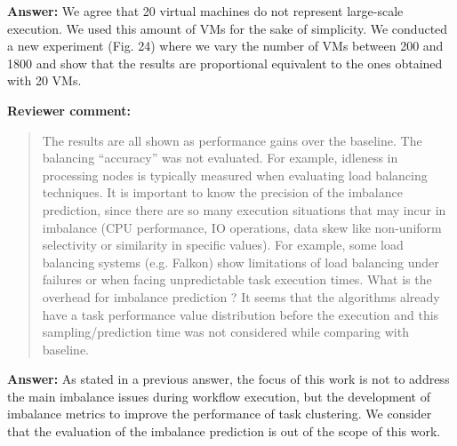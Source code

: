 \documentclass{letter}
\newenvironment{review}%
{\textbf{Reviewer comment:}\begin{quote}}%
{\end{quote}}%
\newcommand{\answer}[1]{%
      \textbf{Answer:} #1}
\begin{document}
\begin{letter}{}
\answer{We agree that 20 virtual machines do not represent large-scale execution. We used this amount of VMs for the sake of simplicity. We conducted a new experiment (Fig. 24) where we vary the number of VMs between 200 and 1800 and show that the results are proportional equivalent to the ones obtained with 20 VMs.}


\begin{review}
The results are all shown as performance gains over the baseline. The balancing ``accuracy'' was not evaluated. For example, idleness in processing nodes is typically measured when evaluating load balancing techniques. It is important to know the precision of the imbalance prediction, since there are so many execution situations that may incur in imbalance (CPU performance, IO operations, data skew like non-uniform selectivity or similarity in specific values). For example, some load balancing systems (e.g. Falkon) show limitations of load balancing under failures or when facing unpredictable task execution times. What is the overhead for imbalance prediction ? It seems that the algorithms already have a task performance value distribution before the execution and this sampling/prediction time was not considered while comparing with baseline.
\end{review}

\answer{As stated in a previous answer, the focus of this work is not to address the main imbalance issues during workflow execution, but the development of imbalance metrics to improve the performance of task clustering. We consider that the evaluation of the imbalance prediction is out of the scope of this work.}



\end{letter}
\end{document}
